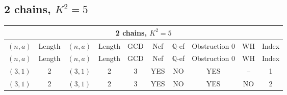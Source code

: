 \subsection{2 chains, \(K^2 = 5\)}
\begin{longtable}{|c|c|c|c|c|c|c|c|c|c|}
\hline
\multicolumn{10}{|c|}{2 chains, $K^2 = 5$}\\
\hline
$(n,a)$ & Length & $(n,a)$ & Length & GCD & Nef & $\mathbb Q$-ef & Obstruction 0 & WH & Index\\
\hline
\endfirsthead

\hline
$(n,a)$ & Length & $(n,a)$ & Length & GCD & Nef & $\mathbb Q$-ef & Obstruction 0 & WH & Index\\
\hline
\endhead
\hline
\endfoot

$(3, 1)$ & 2 & $(3, 1)$ & 2 & 3 & YES & NO & YES & -- & 1\\
$(3, 1)$ & 2 & $(3, 1)$ & 2 & 3 & YES & NO & YES & NO & 2
\end{longtable}
